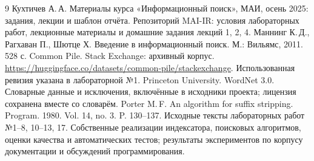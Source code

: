 \clearpage
{}
\begin{thebibliography}{9}
 Кухтичев А.\,А. Материалы курса «Информационный поиск»,
МАИ, осень 2025: задания, лекции и шаблон отчёта.
Репозиторий MAI-IR: условия лабораторных работ,
лекционные материалы и домашние задания лекций 1, 2, 4.
 Маннинг К.\,Д., Рагхаван П., Шютце Х.
Введение в информационный поиск. М.: Вильямс, 2011. 528 с.
 Common Pile. Stack Exchange: архивный корпус.
\url{https://huggingface.co/datasets/common-pile/stackexchange}.
Использованная ревизия указана в лабораторной №1.
 Princeton University. WordNet 3.0.
Словарные данные и исключения, включённые в исходники проекта;
лицензия сохранена вместе со словарём.
 Porter M.\,F. An algorithm for suffix stripping.
Program. 1980. Vol. 14, no. 3. P. 130--137.
 Исходные тексты лабораторных работ №1--8,
10--13, 17. Собственные реализации индексатора, поисковых алгоритмов,
оценки качества и автоматических тестов; результаты экспериментов
по корпусу документации и обсуждений программирования.
\end{thebibliography}
